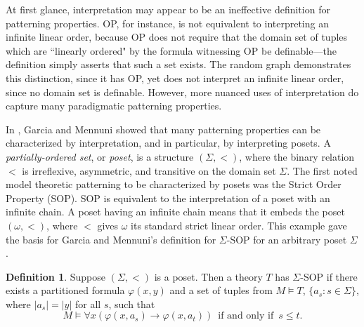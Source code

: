 \documentclass{article}
\newcommand{\bbQ}{\mathbb{Q}}
\newcommand{\bbZ}{\mathbb{Z}}
\newcommand{\IFF}{\enspace\text{if and only if}\enspace}
\newcommand{\vphi}{\varphi}
\theoremstyle{definition}
\newtheorem{definition}{Definition}
\theoremstyle{definition}
\theoremstyle{definition}
\begin{document}

At first glance, interpretation may appear to be an ineffective definition for patterning properties. OP, for instance, is not equivalent to interpreting an infinite linear order, because OP does not require that the domain set of tuples which are ``linearly ordered" by the formula witnessing OP be definable---the definition simply asserts that such a set exists. The random graph demonstrates this distinction, since it has OP, yet does not interpret an infinite linear order, since no domain set is definable. However, more nuanced uses of interpretation do capture many paradigmatic patterning properties.

In \cite{garcia2022model}, Garcia and Mennuni showed that many patterning properties can be characterized by interpretation, and in particular, by interpreting posets. A \textit{partially-ordered set}, or \textit{poset}, is a structure $(\Sigma, <)$, where the binary relation $<$ is irreflexive, asymmetric, and transitive on the domain set $\Sigma$. The first noted model theoretic patterning to be characterized by posets was the Strict Order Property (SOP). SOP is equivalent to the interpretation of a poset with an infinite chain. A poset having an infinite chain means that it embeds the poset $(\omega, <)$, where $<$ gives $\omega$ its standard strict linear order. This example gave the basis for Garcia and Mennuni's definition for $\Sigma$-SOP for an arbitrary poset $\Sigma$. 

\begin{definition}
    Suppose $(\Sigma, <)$ is a poset. Then a theory $T$ has $\Sigma$-SOP if there exists a partitioned formula $\vphi(x,y)$ and a set of tuples from $M\models T$, $\{a_s\colon s\in\Sigma\}$, where $|a_s|=|y|$ for all $s$, such that 
    \[M\models \forall x(\vphi(x,a_s)\to\vphi(x,a_t))\IFF s\leq t.\]

\end{definition}

\end{document}
